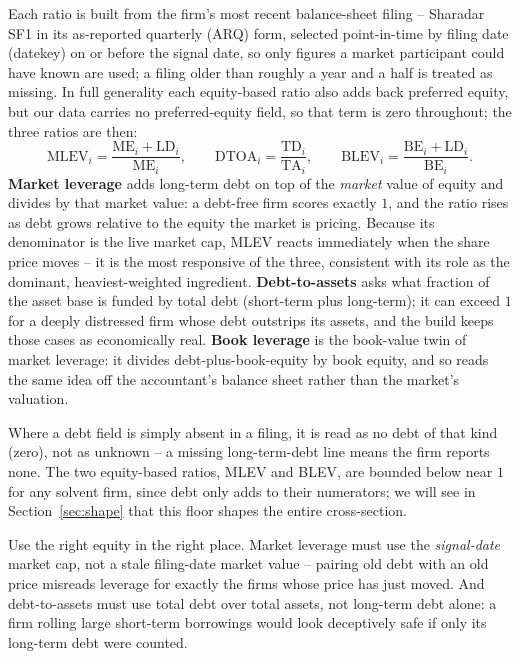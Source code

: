 \documentclass[11pt]{article}
\theoremstyle{definition}
\theoremstyle{plain}
\theoremstyle{remark}
\begin{document}
Each ratio is built from the firm's most recent balance-sheet filing -- Sharadar SF1 in its as-reported quarterly (ARQ) form, selected point-in-time by filing date (datekey) on or before the signal date, so only figures a market participant could have known are used; a filing older than roughly a year and a half is treated as missing. In full generality each equity-based ratio also adds back preferred equity, but our data carries no preferred-equity field, so that term is zero throughout; the three ratios are then:
\[
\text{MLEV}_i = \frac{\text{ME}_i + \text{LD}_i}{\text{ME}_i},
\qquad
\text{DTOA}_i = \frac{\text{TD}_i}{\text{TA}_i},
\qquad
\text{BLEV}_i = \frac{\text{BE}_i + \text{LD}_i}{\text{BE}_i}.
\]
\textbf{Market leverage} adds long-term debt on top of the \emph{market} value of equity and divides by that market value: a debt-free firm scores exactly $1$, and the ratio rises as debt grows relative to the equity the market is pricing. Because its denominator is the live market cap, MLEV reacts immediately when the share price moves -- it is the most responsive of the three, consistent with its role as the dominant, heaviest-weighted ingredient. \textbf{Debt-to-assets} asks what fraction of the asset base is funded by total debt (short-term plus long-term); it can exceed $1$ for a deeply distressed firm whose debt outstrips its assets, and the build keeps those cases as economically real. \textbf{Book leverage} is the book-value twin of market leverage: it divides debt-plus-book-equity by book equity, and so reads the same idea off the accountant's balance sheet rather than the market's valuation.

Where a debt field is simply absent in a filing, it is read as no debt of that kind (zero), not as unknown -- a missing long-term-debt line means the firm reports none. The two equity-based ratios, MLEV and BLEV, are bounded below near $1$ for any solvent firm, since debt only adds to their numerators; we will see in Section~\ref{sec:shape} that this floor shapes the entire cross-section.

\begin{pitfall}
Use the right equity in the right place. Market leverage must use the \emph{signal-date} market cap, not a stale filing-date market value -- pairing old debt with an old price misreads leverage for exactly the firms whose price has just moved. And debt-to-assets must use total debt over total assets, not long-term debt alone: a firm rolling large short-term borrowings would look deceptively safe if only its long-term debt were counted.
\end{pitfall}
\end{document}
